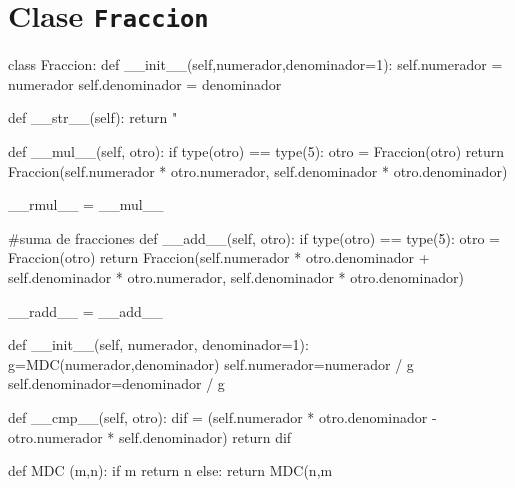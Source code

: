 \section{Clase \texttt{Fraccion}}

\texttt{}
\begin{pythoncode}
class Fraccion:
  def __init__(self,numerador,denominador=1):
    self.numerador = numerador
    self.denominador = denominador

  def __str__(self):
    return "%
  
  def __mul__(self, otro):
    if type(otro) == type(5):
      otro = Fraccion(otro)
    return Fraccion(self.numerador * otro.numerador,
            self.denominador * otro.denominador)
  
  __rmul__ = __mul__ 

  #suma de fracciones
  def __add__(self, otro):
    if type(otro) == type(5):
      otro = Fraccion(otro)
    return Fraccion(self.numerador * otro.denominador +
            self.denominador * otro.numerador,
            self.denominador * otro.denominador)
  
  __radd__ = __add__
  
  def __init__(self, numerador, denominador=1):      
    g=MDC(numerador,denominador)
    self.numerador=numerador / g
    self.denominador=denominador / g
  
  def __cmp__(self, otro):
    dif = (self.numerador * otro.denominador -
       otro.numerador * self.denominador)
    return dif

def MDC (m,n):
      if m%
      return n
      else:
      return MDC(n,m%
\end{pythoncode}

